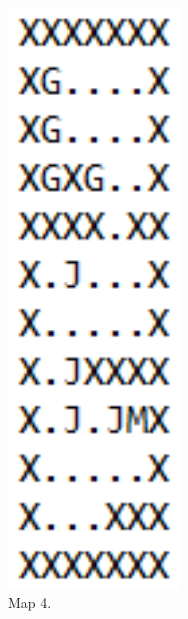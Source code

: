 \documentclass[../report.tex]{subfiles}
\begin{document}
\begin{figure}[H]
\begin{subfigure}[b]{0.19\textwidth}
        \includegraphics[width=0.5\textwidth]{figures/solver_design/map4.png}
        \captionsetup{width=0.9\textwidth}
        \caption{Map 4.}
        \label{subfig:map4}
    \end{subfigure}
    \begin{subfigure}[b]{0.19\textwidth}
        \centering

\end{subfigure}
\end{figure}
\end{document}
